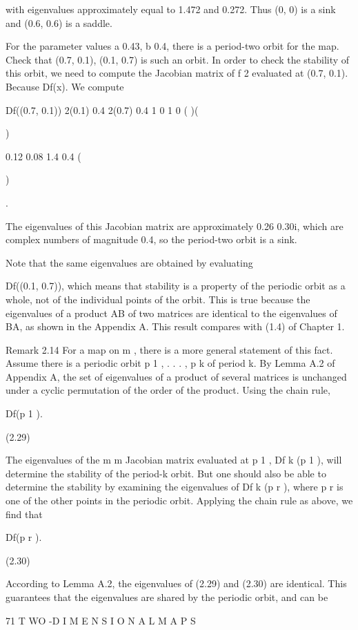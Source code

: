 \documentclass[12pt]{article}
\begin{document}
with eigenvalues approximately equal to 1.472 and 0.272. Thus (0, 0) is a sink and (0.6, 0.6) is a saddle.

For the parameter values a  0.43, b  0.4, there is a period-two orbit for the map. Check that  (0.7, 0.1), (0.1, 0.7)  is such an 
orbit. In order to check the stability of this orbit, we need to compute the Jacobian matrix of f 2 evaluated at (0.7, 0.1). Because 
 Df(x). We compute

 Df((0.7, 0.1)) 2(0.1) 0.4 2(0.7) 0.4  1 0 1 0 ( )(

)



0.12 0.08 1.4 0.4 (

)

.

The eigenvalues of this Jacobian matrix are approximately 0.26  0.30i, which are complex numbers of magnitude  0.4, so the period-two 
orbit is a sink.

Note that the same eigenvalues are obtained by evaluating

 Df((0.1, 0.7)), which means that stability is a property of the periodic orbit as a whole, not of the individual points of the 
orbit. This is true because the eigenvalues of a product AB of two matrices are identical to the eigenvalues of BA, as shown in the 
Appendix A. This result compares with (1.4) of Chapter 1.

Remark 2.14 For a map on  m , there is a more general statement of this fact. Assume there is a periodic orbit  p 1 , . . . , p k  of 
period k. By Lemma A.2 of Appendix A, the set of eigenvalues of a product of several matrices is unchanged under a cyclic permutation 
of the order of the product. Using the chain rule,

 Df(p 1 ).

(2.29)

The eigenvalues of the m m Jacobian matrix evaluated at p 1 , Df k (p 1 ), will determine the stability of the period-k orbit. But 
one should also be able to determine the stability by examining the eigenvalues of Df k (p r ), where p r is one of the other points 
in the periodic orbit. Applying the chain rule as above, we ﬁnd that

 Df(p r ).

(2.30)

According to Lemma A.2, the eigenvalues of (2.29) and (2.30) are identical. This guarantees that the eigenvalues are shared by the 
periodic orbit, and can be

71 T WO -D I M E N S I O N A L M A P S
\end{document}

